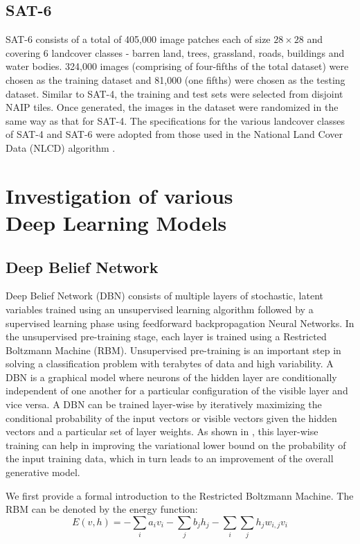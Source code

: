 \documentclass[11pt,a4paper]{article}
\begin{document}
\subsection{SAT-6}
SAT-6 consists of a total of 405,000 image patches each of size $28{\times}28$ and covering 6 landcover classes - barren land, trees, grassland, roads, buildings and water bodies. 324,000 images (comprising of four-fifths of the total dataset) were chosen as the training dataset and 81,000 (one fifths) were chosen as the testing dataset. Similar to SAT-4, the training and test sets were selected from disjoint NAIP tiles. Once generated, the images in the dataset were randomized in the same way as that for SAT-4. The specifications for the various landcover classes of SAT-4 and SAT-6 were adopted from those used in the National Land Cover Data (NLCD) algorithm \cite{nlcd_desc}.

\section{Investigation of various \\
Deep Learning Models}

\subsection{Deep Belief Network} \label{sec:DBN}
Deep Belief Network (DBN) consists of multiple layers of stochastic, latent variables trained using an unsupervised learning algorithm followed by a supervised learning phase using feedforward backpropagation Neural Networks.  In the unsupervised pre-training stage, each layer is trained using a Restricted Boltzmann Machine (RBM). Unsupervised pre-training is an important step in solving a classification problem with terabytes of data and high variability.  A DBN is a graphical model \cite{Koller2009} where neurons of the hidden layer are conditionally independent of one another for a particular configuration of the visible layer and vice versa. A DBN can be trained layer-wise by iteratively maximizing the conditional probability of the input vectors or visible vectors given the hidden vectors and a particular set of layer weights. As shown in \cite{Hinton06afast}, this layer-wise training can help in improving the variational lower bound on the probability of the input training data, which in turn leads to an improvement of the overall generative model. 

We first provide a formal introduction to the Restricted Boltzmann Machine.  
The RBM can be denoted by the energy function:
\begin{equation}
E(v,h) = -\sum_{i} a_i v_i - \sum_{j} b_j h_j - \sum_{i} \sum_{j} h_j w_{i,j} v_i 
\end{equation}
\end{document}
